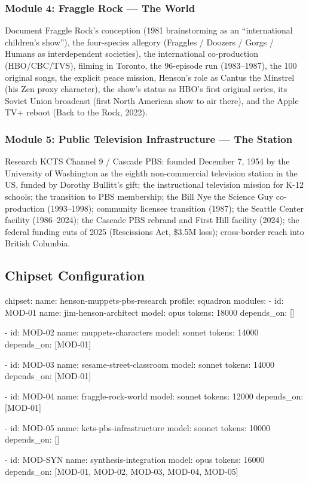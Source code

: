 \documentclass[11pt,letterpaper]{article}
\begin{document}
\subsubsection{Module 4: Fraggle Rock --- The World}
Document Fraggle Rock's conception (1981 brainstorming as an ``international children's show''), the four-species allegory (Fraggles / Doozers / Gorgs / Humans as interdependent societies), the international co-production (HBO/CBC/TVS), filming in Toronto, the 96-episode run (1983--1987), the 100 original songs, the explicit peace mission, Henson's role as Cantus the Minstrel (his Zen proxy character), the show's status as HBO's first original series, its Soviet Union broadcast (first North American show to air there), and the Apple TV+ reboot (Back to the Rock, 2022).

\subsubsection{Module 5: Public Television Infrastructure --- The Station}
Research KCTS Channel 9 / Cascade PBS: founded December 7, 1954 by the University of Washington as the eighth non-commercial television station in the US, funded by Dorothy Bullitt's gift; the instructional television mission for K-12 schools; the transition to PBS membership; the Bill Nye the Science Guy co-production (1993--1998); community licensee transition (1987); the Seattle Center facility (1986--2024); the Cascade PBS rebrand and First Hill facility (2024); the federal funding cuts of 2025 (Rescissions Act, \$3.5M loss); cross-border reach into British Columbia.

\subsection{Chipset Configuration}

\begin{asciibox}
chipset:
  name: henson-muppets-pbs-research
  profile: squadron
  modules:
    - id: MOD-01
      name: jim-henson-architect
      model: opus
      tokens: 18000
      depends_on: []

    - id: MOD-02
      name: muppets-characters
      model: sonnet
      tokens: 14000
      depends_on: [MOD-01]

    - id: MOD-03
      name: sesame-street-classroom
      model: sonnet
      tokens: 14000
      depends_on: [MOD-01]

    - id: MOD-04
      name: fraggle-rock-world
      model: sonnet
      tokens: 12000
      depends_on: [MOD-01]

    - id: MOD-05
      name: kcts-pbs-infrastructure
      model: sonnet
      tokens: 10000
      depends_on: []

    - id: MOD-SYN
      name: synthesis-integration
      model: opus
      tokens: 16000
      depends_on: [MOD-01, MOD-02, MOD-03, MOD-04, MOD-05]
\end{asciibox}
\end{document}
